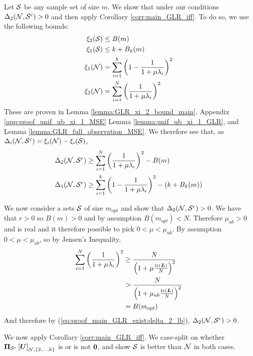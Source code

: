 Let $\mathcal{S}$ be any sample set of size $m$. We show that under our conditions $\Delta_{2}(\mathcal{N},\mathcal{S}^{c}) > 0$ and then apply Corollary \ref{corr:main_GLR_iff}. 
To do so, we use the following bounds:
\begin{align}
    \xi_{2}(\mathcal{S}) &\leq B(m) \\
    \xi_{1}(\mathcal{S}) &\leq k + B_{k}(m) \\
    \xi_{1}(\mathcal{N}) &= \sum_{i=1}^{k} \left(1 - \frac{1}{1+\mu\lambda_{i}}\right)^{2} \\
    \xi_{2}(\mathcal{N}) & = \sum_{i=1}^{N} \left( \frac{1}{1+\mu\lambda_{i}}\right)^{2}
\end{align}
These are proven in Lemma \ref{lemma:GLR_xi_2_bound_main}, Appendix \ref{app:proof_unif_ub_xi_1_MSE} Lemma \ref{lemma:unif_ub_xi_1_GLR}, and Lemma \ref{lemma:GLR_full_observation_MSE}.
We therefore see that, as $\Delta_{i}(\mathcal{N},\mathcal{S}^{c}) = \xi_{i}(\mathcal{N}) - \xi_{i}(\mathcal{S})$,
\begin{align}
    \Delta_{2}(\mathcal{N},\mathcal{S}^{c}) &\geq \sum_{i=1}^{N} \left( \frac{1}{1+\mu\lambda_{i}}\right)^{2} - B(m) \label{eq:proof_main_GLR_exist:delta_2_lb} \\
    \Delta_{1}(\mathcal{N},\mathcal{S}^{c}) &\geq \sum_{i=1}^{k} \left(1 - \frac{1}{1+\mu\lambda_{i}}\right)^{2} - (k + B_{k}(m)) \label{eq:proof_main_GLR_exist:delta_1_lb}
\end{align}

We now consider a sets $\mathcal{S}$ of size $m_{opt}$ and show that $\Delta_{2}(\mathcal{N},\mathcal{S}^{c}) > 0$. We have that $r > 0$ so $B(m) > 0$ and by assumption $B(m_{opt}) < N$. Therefore $\mu_{ub} > 0$ and is real and it therefore possible to pick $0 < \mu < \mu_{ub}$.
By assumption $0<\mu<\mu_{ub}$, so by Jensen's Inequality,
\begin{align}
    \sum_{i=1}^{N}\left(\frac{1}{1 + \mu\lambda_{i}}\right)^{2} &\geq \frac{N}{\left(1+\mu\frac{\textrm{tr}\left( \bm{L}
 \right)}{N}  \right)^{2}}\\
    &> \frac{N}{\left(1+\mu_{ub}\frac{\textrm{tr}\left( \bm{L}
 \right)}{N} 
  \right)^{2}}\\ 
    &= B(m_{opt})
\end{align}
And therefore by (\ref{eq:proof_main_GLR_exist:delta_2_lb}), $\Delta_{2}(\mathcal{N},\mathcal{S}^{c}) > 0$. 

We now apply Corollary \ref{corr:main_GLR_iff}. We case-split on whether $ \projgen{\set{S}^{c}}\msubgen[\set{N},\{2,\ldots,k\}]{\matr{U}}$ is or is not $\bm{0}$, and show $\mathcal{S}$ is better than $\mathcal{N}$ in both cases.

